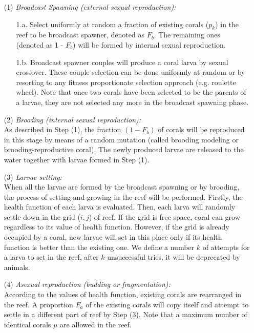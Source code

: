 \documentclass[smallcondensed, natbib]{svjour3}     %
\begin{document}
\begin{enumerate}
\item[(1)]\textit{Broadcast Spawning (external sexual reproduction):}
\begin{enumerate}

\item[1.a.] Select uniformly at random a fraction of existing corals ($p_{k}$) in the reef to be broadcast spawner, denoted as $F_{b}$. The remaining ones (denoted as 1 - $F_{b}$) will be formed by internal sexual reproduction.

\item[1.b.] Broadcast spawner couples will produce a coral larva by sexual crossover. These couple selection can be done uniformly at random or by resorting to any fitness proportionate selection approach (e.g. roulette wheel). Note that once two corals have been selected to be the parents of a larvae, they are not selected any more in the broadcast spawning phase.
\end{enumerate}

\item[(2)] \textit{Brooding (internal sexual reproduction):} \\
As described in Step (1), the fraction $(1 - F_{b})$ of corals will be reproduced in this stage by means of a random mutation (called brooding modeling or brooding-reproductive coral). The newly produced larvae are released to the water together with larvae formed in Step (1).

\item[(3)] \textit{Larvae setting:} \\
When all the larvae are formed by the broadcast spawning or by brooding, the process of setting and growing in the reef will be performed. Firstly, the health function of each larva is evaluated. Then, each larva will randomly settle down in the grid ($i,j$) of reef. If the grid is free space, coral can grow regardless to its value of health function. However, if the grid is already occupied by a coral, new larvae will set in this place only if its health function is better than the existing one. We define a number $k$ of attempts for a larva to set in the reef, after $k$ unsuccessful tries, it will be deprecated by animals.

\item[(4)] \textit{Asexual reproduction (budding or fragmentation):} \\
According to the values of health function, existing corals are rearranged in the reef. A proportion $F_a$ of the existing corals will copy itself and attempt to settle in a different part of reef by Step (3). Note that a maximum number of identical corals $\mu$ are allowed in the reef.


\end{enumerate}
\end{document}
